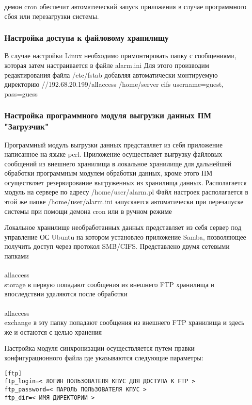 \documentclass[12pt]{article}[a4paper,14pt,russian]
\begin{document}
	демон cron обеспечит автоматический запуск приложения в случае программного сбоя или перезагрузки системы.


	\subsubsection{Настройка доступа к файловому хранилищу}
	В случае настройки Linux необходимо примонтировать папку с сообщениями, которая затем настраивается в файле alarm.ini
	Для этого производим редактирования файла /etc/fstab добавляя автоматически монтируемую директорию
	//192.68.20.199/allaccess /home/server cifs username=guest, pass=guess
	\subsubsection{Настройка программного модуля выгрузки данных ПМ "Загрузчик"}
	Программный модуль выгрузки данных представляет из себя приложение написанное на языке perl. Приложение осуществляет выгрузку файловых сообщений из внешнего хранилища в локальное хранилище для дальнейшей обработки программным модулем обработки данных, кроме этого ПМ осуществляет резервирование выгруженных из хранилища данных.
	Располагается модуль на сервере по адресу
	/home/user/alarm.pl
	Файл настроек располагается в этой же папке 
	/home/user/alarm.ini
	запускается автоматически при перезапуске системы при помощи демона cron или в ручном режиме
	 \newline
    \newline
  

	Локальное хранилище необработанных данных представляет из себя сервер под управление ОС Ubuntu на котором установлео приложение Samba, позволяющее  получить доступ через протокол SMB/CIFS. Представлено двумя сетевыми папками
	\\<ip адрес сервера>\\allaccess\\storage
	в первую попадают сообщения из внешнего FTP хранилища и впоследствии удаляются после обработки
	\\<ip адрес сервера>\\allaccess\\exchange
	в эту папку попадают сообщения из внешнего FTP хранилища и здесь же и остаются
	с целью хранения
 
Настройка модуля синхронизации осуществляется путем правки конфигурационного файла где указываются следующие параметры:
\begin{verbatim}
[ftp]
ftp_login=< ЛОГИН ПОЛЬЗОВАТЕЛЯ КПУС ДЛЯ ДОСТУПА К FTP >
ftp_password=< ПАРОЛЬ ПОЛЬЗОВАТЕЛЯ КПУС >
ftp_dir=< ИМЯ ДИРЕКТОРИИ >
\end{verbatim}
\end{document}
